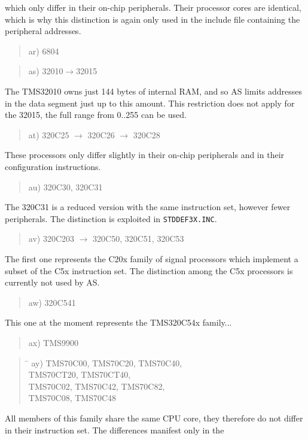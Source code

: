 \documentclass[12pt,twoside]{report}
\newcommand{\tty}[1]{{\tt #1}}
\begin{document}
which only differ in their on-chip peripherals.  Their processor
cores are identical, which is why this distinction is again only used
in the include file containing the peripheral addresses.
\begin{quote}
ar) 6804
\end{quote}
\begin{quote}
as) 32010$\rightarrow$32015
\end{quote}
The TMS32010 owns just 144 bytes of internal RAM, and so AS limits
addresses in the data segment just up to this amount.  This restriction
does not apply for the 32015, the full range from 0..255 can be used.
\begin{quote}
at) 320C25 $\rightarrow$ 320C26 $\rightarrow$ 320C28
\end{quote}
These processors only differ slightly in their on-chip peripherals
and in their configuration instructions.
\begin{quote}
au) 320C30, 320C31
\end{quote}
The 320C31 is a reduced version with the same instruction set,
however fewer peripherals.  The distinction is exploited in
\tty{STDDEF3X.INC}.
\begin{quote}
av) 320C203 $\rightarrow$ 320C50, 320C51, 320C53
\end{quote}
The first one represents the C20x family of signal processors which
implement a subset of the C5x instruction set.  The distinction among the
C5x processors is currently not used by AS.
\begin{quote}
aw) 320C541  
\end{quote}  
This one at the moment represents the TMS320C54x family...
\begin{quote}
ax) TMS9900
\end{quote}
\begin{quote}
\begin{tabbing}
\hspace{0.7cm} \= \kill
ay) \> TMS70C00, TMS70C20, TMS70C40,\\
    \> TMS70CT20, TMS70CT40,\\
    \> TMS70C02, TMS70C42, TMS70C82,\\
    \> TMS70C08, TMS70C48\\
\end{tabbing}
\end{quote}
All members of this family share the same CPU core, they therefore do not
differ in their instruction set.  The differences manifest only in the
\end{document}

